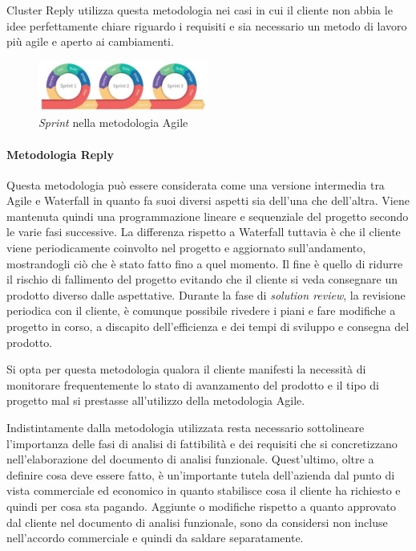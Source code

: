 Cluster Reply utilizza questa metodologia nei casi in cui il cliente non abbia le idee perfettamente chiare riguardo i requisiti e sia necessario un metodo di lavoro più agile e aperto ai cambiamenti.

\begin{figure}[ht]
  \centering
  \includegraphics[width=0.50\textwidth]{agile.png}
  \caption{\textit{Sprint} nella metodologia Agile}
  \label{fig:sprintAgile}
\end{figure}

\paragraph{Metodologia Reply} Questa metodologia può essere considerata come una versione intermedia tra Agile e Waterfall in quanto fa suoi diversi aspetti sia dell'una che dell'altra. Viene mantenuta quindi una programmazione lineare e sequenziale del progetto secondo le varie fasi successive. La differenza rispetto a Waterfall tuttavia è che il cliente viene periodicamente coinvolto nel progetto e aggiornato sull'andamento, mostrandogli ciò che è stato fatto fino a quel momento. Il fine è quello di ridurre il rischio di fallimento del progetto evitando che il cliente si veda consegnare un prodotto diverso dalle aspettative. Durante la fase di \textit{solution review}, la revisione periodica con il cliente, è comunque possibile rivedere i piani e fare modifiche a progetto in corso, a discapito dell'efficienza e dei tempi di sviluppo e consegna del prodotto.

Si opta per questa metodologia qualora il cliente manifesti la necessità di monitorare frequentemente lo stato di avanzamento del prodotto e il tipo di progetto mal si prestasse all'utilizzo della metodologia Agile.

\setlength{\parskip}{2em}
Indistintamente dalla metodologia utilizzata resta necessario sottolineare l'importanza delle fasi di analisi di fattibilità e dei requisiti che si concretizzano nell'elaborazione del documento di analisi funzionale. Quest'ultimo, oltre a definire cosa deve essere fatto, è un'importante tutela dell'azienda dal punto di vista commerciale ed economico in quanto stabilisce cosa il cliente ha richiesto e quindi per cosa sta pagando. Aggiunte o modifiche rispetto a quanto approvato dal cliente nel documento di analisi funzionale, sono da considersi non incluse nell'accordo commerciale e quindi da saldare separatamente.
\setlength{\parskip}{0em}

